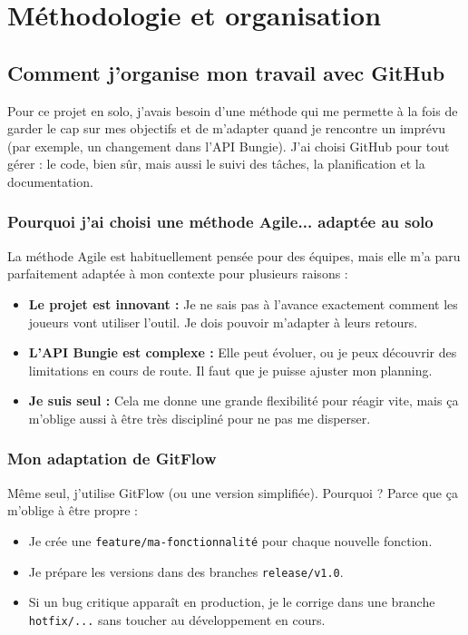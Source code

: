 \chapter{Méthodologie et organisation}

\section{Comment j'organise mon travail avec GitHub}

Pour ce projet en solo, j'avais besoin d'une méthode qui me permette à la fois de garder le cap sur mes objectifs et de m'adapter quand je rencontre un imprévu (par exemple, un changement dans l'API Bungie). J'ai choisi GitHub pour tout gérer : le code, bien sûr, mais aussi le suivi des tâches, la planification et la documentation.

\subsection{Pourquoi j'ai choisi une méthode Agile... adaptée au solo}

La méthode Agile est habituellement pensée pour des équipes, mais elle m'a paru parfaitement adaptée à mon contexte pour plusieurs raisons :

\begin{itemize}
    \item \textbf{Le projet est innovant :} Je ne sais pas à l'avance exactement comment les joueurs vont utiliser l'outil. Je dois pouvoir m'adapter à leurs retours.
    \item \textbf{L'API Bungie est complexe :} Elle peut évoluer, ou je peux découvrir des limitations en cours de route. Il faut que je puisse ajuster mon planning.
    \item \textbf{Je suis seul :} Cela me donne une grande flexibilité pour réagir vite, mais ça m'oblige aussi à être très discipliné pour ne pas me disperser.
\end{itemize}

\subsection{Mon adaptation de GitFlow}

Même seul, j'utilise GitFlow (ou une version simplifiée). Pourquoi ? Parce que ça m'oblige à être propre :

\begin{itemize}
    \item Je crée une \texttt{feature/ma-fonctionnalité} pour chaque nouvelle fonction.
    \item Je prépare les versions dans des branches \texttt{release/v1.0}.
    \item Si un bug critique apparaît en production, je le corrige dans une branche \texttt{hotfix/...} sans toucher au développement en cours.
\end{itemize}

